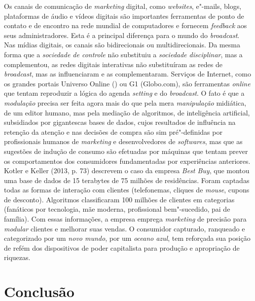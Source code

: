 Os canais de comunicação de \emph{marketing} digital, como
\emph{websites}, e"-mails, blogs, plataformas de áudio e vídeos digitais
são importantes ferramentas de ponto de contato e de encontro na rede
mundial de computadores e fornecem \emph{feedback} aos seus
administradores. Esta é a principal diferença para o mundo do
\emph{broadcast}. Nas mídias digitais, os canais são bidirecionais ou
multidirecionais. Da mesma forma que a \emph{sociedade de controle} não
substituiu a \emph{sociedade disciplinar}, mas a complementou, as redes
digitais interativas não substituíram as redes de \emph{broadcast}, mas
as influenciaram e as complementaram. Serviços de Internet, como os
grandes portais Universo Online () ou G1 (Globo.com), são ferramentas
\emph{online} que tentam reproduzir a lógica do agenda \emph{setting} e
do \emph{broadcast}. O fato é que a \emph{modulação} precisa ser feita
agora mais do que pela mera \emph{manipulação} midiática, de um editor
humano, mas pela mediação de algoritmos, de inteligência artificial,
subsidiados por gigantescas bases de dados, cujos resultados de
influência na retenção da atenção e nas decisões de compra são sim
pré"-definidas por profissionais humanos de \emph{marketing} e
desenvolvedores de \emph{softwares}, mas que as sugestões de indução de
consumo são efetuadas por máquinas que tentam prever os comportamentos
dos consumidores fundamentadas por experiências anteriores. Kotler e
Keller (2013, p. 73) descrevem o caso da empresa \emph{Best Buy}, que
montou uma base de dados de 15 terabytes de 75 milhões de residências.
Foram captadas todas as formas de interação com clientes (telefonemas,
cliques de \emph{mouse}, cupons de desconto). Algoritmos classificaram
100 milhões de clientes em categorias (fanáticos por tecnologia, mãe
moderna, profissional bem"-sucedido, pai de família). Com essas
informações, a empresa emprega \emph{marketing} de precisão para
\emph{modular} clientes e melhorar suas vendas. O consumidor capturado,
ranqueado e categorizado por um \emph{novo mundo}, por um \emph{oceano
azul}, tem reforçada sua posição de refém dos dispositivos de poder
capitalista para produção e apropriação de riquezas.

\section{Conclusão}

